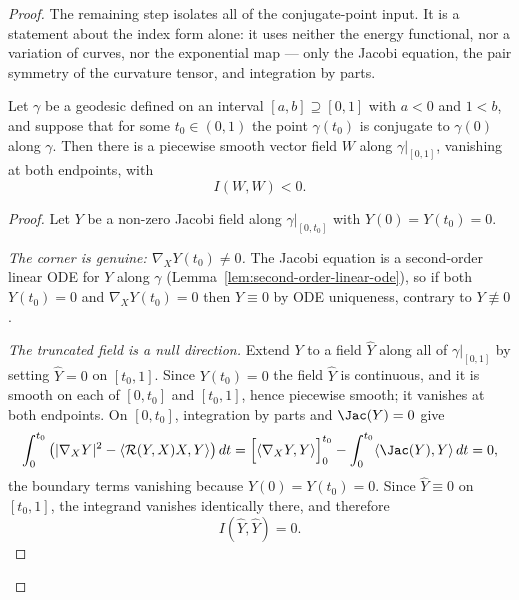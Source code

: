 \begin{proof}
The remaining step isolates all of the conjugate-point input.  It is a statement
about the index form alone: it uses neither the energy functional, nor a
variation of curves, nor the exponential map — only the Jacobi equation, the pair
symmetry of the curvature tensor, and integration by parts.

\begin{lemma}
\label{lem:index-form-negative-at-conjugate}
\leanok
Let $\gamma$ be a geodesic defined on an interval $[a,b]\supseteq [0,1]$ with
$a<0$ and $1<b$, and suppose that for some $t_0\in(0,1)$ the point $\gamma(t_0)$
is conjugate to $\gamma(0)$ along $\gamma$. Then there is a piecewise smooth
vector field $W$ along $\gamma|_{[0,1]}$, vanishing at both endpoints, with
$$I(W,W)<0 .$$
\end{lemma}

\begin{proof}
\leanok
Let $Y$ be a non-zero Jacobi field along $\gamma|_{[0,t_0]}$ with
$Y(0)=Y(t_0)=0$.

\emph{The corner is genuine: $\nabla_XY(t_0)\not=0$.} The Jacobi equation is a
second-order linear ODE for $Y$ along $\gamma$
(Lemma~\ref{lem:second-order-linear-ode}), so if both $Y(t_0)=0$ and
$\nabla_XY(t_0)=0$ then $Y\equiv0$ by ODE uniqueness, contrary to $Y\not\equiv0$.

\emph{The truncated field is a null direction.} Extend $Y$ to a field $\hat Y$
along all of $\gamma|_{[0,1]}$ by setting $\hat Y=0$ on $[t_0,1]$. Since
$Y(t_0)=0$ the field $\hat Y$ is continuous, and it is smooth on each of
$[0,t_0]$ and $[t_0,1]$, hence piecewise smooth; it vanishes at both endpoints.
On $[0,t_0]$, integration by parts and $\Jac(Y)=0$ give
$$\int_0^{t_0}\left(|\nabla_XY|^2-\langle{\mathcal R}(Y,X)X,Y\rangle\right)dt
=\Bigl[\langle\nabla_XY,Y\rangle\Bigr]_0^{t_0}
-\int_0^{t_0}\langle \Jac(Y),Y\rangle\,dt=0,$$
the boundary terms vanishing because $Y(0)=Y(t_0)=0$. Since $\hat Y\equiv0$ on
$[t_0,1]$, the integrand vanishes identically there, and therefore
$$I(\hat Y,\hat Y)=0 .$$


\end{proof}
\end{proof}
